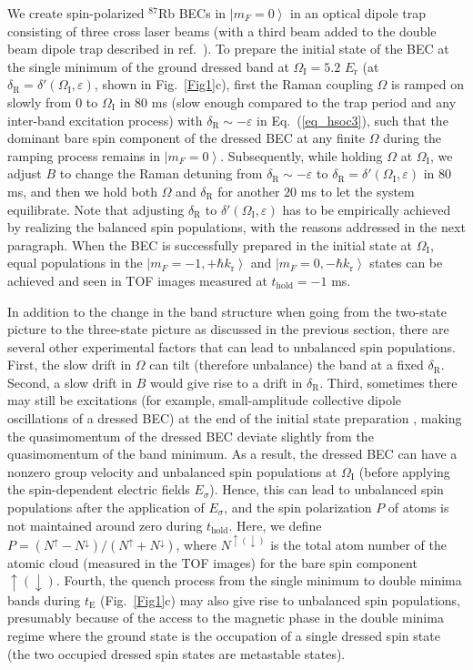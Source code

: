 \documentclass[showpacs,preprintnumbers,amsmath,amssymb, superscriptaddress, aps, reprint]{revtex4-1}
\def\E_r{E_{\text{r}}}
\def\k_r{k_{\text{r}}}
\def\deltaR{\delta_{\text{R}}}
\def\OmegaI{\Omega_{\text{I}}}
\def\thold{t_{\text{hold}}}
\begin{document}
{{{We create spin-polarized $^{87}$Rb BECs in $\left| {{m_F} = 0} \right\rangle$ in an optical dipole trap consisting of three cross laser beams (with a third beam added to the double beam dipole trap described in ref.~\cite{Olson_EC_PhysRevA2013}). To prepare the initial state of the BEC at the single minimum of the ground dressed band at $\OmegaI = 5.2$ $\E_r$ (at ${\deltaR} = \delta '({\OmegaI},\varepsilon )$, shown in Fig.~\ref{Fig1}c), first the Raman coupling $\Omega$ is ramped on slowly from 0 to $\OmegaI$ in $80$ ms (slow enough compared to the trap period and any inter-band excitation process) with ${\deltaR} \sim - \varepsilon$ in Eq.~(\ref{eq_hsoc3}), such that the dominant bare spin component of the dressed BEC at any finite $\Omega$ during the ramping process remains in $\left| {{m_F} = 0} \right\rangle$. Subsequently, while holding $\Omega$ at $\OmegaI$, we adjust $B$ to change the Raman detuning from ${\deltaR} \sim - \varepsilon$ to ${\deltaR} = \delta '({\OmegaI},\varepsilon )$ in $80$ ms, and then we hold both $\Omega$ and $\deltaR$ for another $20$ ms to let the system equilibrate. Note that adjusting ${\deltaR}$ to $\delta '({\OmegaI},\varepsilon )$ has to be empirically achieved by realizing the balanced spin populations, with the reasons addressed in the next paragraph. When the BEC is successfully prepared in the initial state at $\OmegaI$, equal populations in the $\left| {{m_F} =  - 1, + \hbar {\k_r}} \right\rangle$ and $\left| {{m_F} = 0, - \hbar {\k_r}} \right\rangle$ states can be achieved and seen in TOF images measured at $\thold=-1$ ms. 

In addition to the change in the band structure when going from the two-state picture to the three-state picture as discussed in the previous section, there are several other experimental factors that can lead to unbalanced spin populations. First, the slow drift in $\Omega$ can tilt (therefore unbalance) the band at a fixed $\deltaR$. Second, a slow drift in $B$ would give rise to a drift in $\deltaR$. Third, sometimes there may still be excitations (for example, small-amplitude collective dipole oscillations of a dressed BEC) at the end of the initial state preparation \cite{Hamner2014}, making the quasimomentum of the dressed BEC deviate slightly from the quasimomentum of the band minimum. As a result, the dressed BEC can have a nonzero group velocity and unbalanced spin populations at $\OmegaI$ (before applying the spin-dependent electric fields $E_{\sigma}$). Hence, this can lead to unbalanced spin populations after the application of $E_{\sigma}$, and the spin polarization $P$ of atoms is not maintained around zero during $\thold$. Here, we define $P = ({N^ \uparrow } - {N^ \downarrow })/({N^ \uparrow } + {N^ \downarrow })$, where ${N^{\uparrow(\downarrow)}}$ is the total atom number of the atomic cloud (measured in the TOF images) for the bare spin component $\uparrow(\downarrow)$. Fourth, the quench process from the single minimum to double minima bands during $t_{\text{E}}$ (Fig.~\ref{Fig1}c) may also give rise to unbalanced spin populations, presumably because of the access to the magnetic phase in the double minima regime where the ground state is the occupation of a single dressed spin state (the two occupied dressed spin states are metastable states).

}}}
\end{document}

